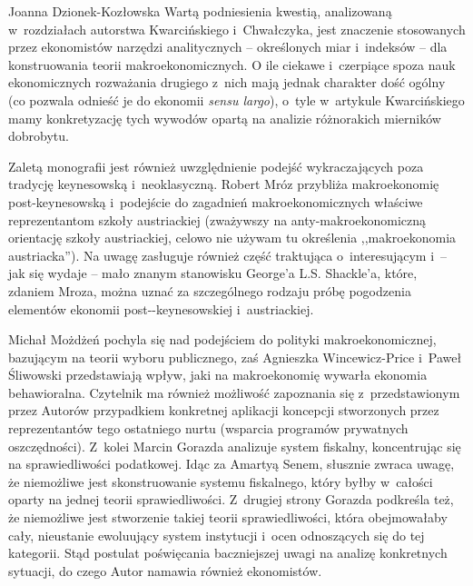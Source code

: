 \begin{recplenv}{Joanna Dzionek-Kozłowska}
Wartą podniesienia kwestią, analizowaną w~rozdziałach autorstwa Kwarcińskiego i~Chwałczyka, jest znaczenie stosowanych
przez ekonomistów narzędzi analitycznych -- określonych miar i~indeksów -- dla konstruowania teorii makroekonomicznych.
O ile ciekawe i~czerpiące spoza nauk ekonomicznych rozważania drugiego z~nich mają jednak charakter dość ogólny (co
pozwala odnieść je do ekonomii \textit{sensu largo}), o~tyle w~artykule Kwarcińskiego mamy konkretyzację tych wywodów
opartą na analizie różnorakich mierników dobrobytu. 

Zaletą monografii jest również uwzględnienie podejść wykraczających poza tradycję keynesowską i~neoklasyczną. Robert
Mróz przybliża makroekonomię post-keynesowską i~podejście do zagadnień makroekonomicznych właściwe reprezentantom
szkoły austriackiej (zważywszy na anty-makroekonomiczną orientację szkoły austriackiej, celowo nie używam tu określenia
,,makroekonomia austriacka''). Na uwagę zasługuje również część traktująca o~interesującym i~-- jak się wydaje -- mało
znanym stanowisku George'a L.S. Shackle'a, które, zdaniem Mroza, można uznać za szczególnego rodzaju próbę pogodzenia
elementów ekonomii post-\mbox{-keynesowskiej} i~austriackiej.

Michał Możdżeń pochyla się nad podejściem do polityki makroekonomicznej, bazującym na teorii wyboru publicznego, zaś
Agnieszka Wincewicz-Price i~Paweł Śliwowski przedstawiają wpływ, jaki na makroekonomię wywarła ekonomia behawioralna.
Czytelnik ma również możliwość zapoznania się z~przedstawionym przez Autorów przypadkiem konkretnej aplikacji koncepcji
stworzonych przez reprezentantów tego ostatniego nurtu (wsparcia programów prywatnych oszczędności). Z~kolei Marcin
Gorazda analizuje system fiskalny, koncentrując się na sprawiedliwości podatkowej. Idąc za Amartyą Senem, słusznie
zwraca uwagę, że niemożliwe jest skonstruowanie systemu fiskalnego, który byłby w~całości oparty na jednej teorii
sprawiedliwości. Z~drugiej strony Gorazda podkreśla też, że niemożliwe jest stworzenie takiej teorii sprawiedliwości,
która obejmowałaby cały, nieustanie ewoluujący system instytucji i~ocen odnoszących się do tej kategorii. Stąd postulat
poświęcania baczniejszej uwagi na analizę konkretnych sytuacji, do czego Autor namawia również ekonomistów.


\end{recplenv}

